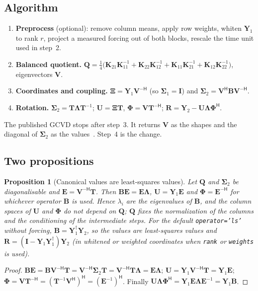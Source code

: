 \documentclass[report]{nld}
\newtheorem{proposition}{Proposition}
\theoremstyle{remark}\newtheorem*{remark}{Remark}
\newcommand{\B}{\mathbf{B}}
\newcommand{\V}{\mathbf{V}}
\newcommand{\T}{\mathbf{T}}
\newcommand{\Y}{\mathbf{Y}}
\newcommand{\K}{\mathbf{K}}
\newcommand{\Q}{\mathbf{Q}}
\newcommand{\U}{\mathbf{U}}
\newcommand{\E}{\mathbf{E}}
\newcommand{\R}{\mathbf{R}}
\newcommand{\Sg}{\symbf{\Sigma}}
\newcommand{\Lam}{\symbf{\Lambda}}
\newcommand{\Ph}{\symbf{\Phi}}
\newcommand{\Xib}{\symbf{\Xi}}
\renewcommand{\H}{\mathsf{H}}
\newcommand{\code}[1]{\texttt{#1}}
\begin{document}
\subsection{Algorithm}\label{sec:algorithm}

\begin{enumerate}
  \item \textbf{Preprocess} (optional): remove column means, apply row weights,
    whiten $\Y_1$ to rank $r$, project a measured forcing out of both blocks,
    rescale the time unit used in step~2.
  \item \textbf{Balanced quotient.}
    $\Q=\tfrac14\big(\K_{21}\K_{11}^{-1}+\K_{22}\K_{12}^{-1}+\K_{11}\K_{21}^{-1}+\K_{12}\K_{22}^{-1}\big)$,
    eigenvectors $\V$.
  \item \textbf{Coordinates and coupling.} $\Xib=\Y_1\V^{-\H}$ (so $\Sg_1=\mathbf{I}$)
    and $\Sg_2=\V^{\H}\B\V^{-\H}$.
  \item \textbf{Rotation.} $\Sg_2=\T\Lam\T^{-1}$; $\U=\Xib\T$, $\Ph=\V\T^{-\H}$;
    $\R=\Y_2-\U\Lam\Ph^\H$.
\end{enumerate}
The published GCVD stops after step~3. It returns $\V$ as the shapes and the
diagonal of $\Sg_2$ as the values~\cite[Algorithm~1, Eqs.~(13)--(14)]{li2025}.
Step~4 is the change.

\subsection{Two propositions}\label{sec:props}

\begin{proposition}[Canonical values are least-squares values]\label{prop:ls}
Let $\Q$ and $\Sg_2$ be diagonalisable and $\E=\V^{-\H}\T$. Then $\B\E=\E\Lam$,
$\U=\Y_1\E$ and $\Ph=\E^{-\H}$ for whichever operator $\B$ is used. Hence
$\lambda_i$ are the eigenvalues of $\B$, and the column spaces of $\U$ and
$\Ph$ do not depend on $\Q$; $\Q$ fixes the normalization of the columns and
the conditioning of the intermediate steps. For the default
\code{operator='ls'} without forcing, $\B=\Y_1^\dagger\Y_2$, so the values are
least-squares values and $\R=(\mathbf{I}-\Y_1\Y_1^\dagger)\Y_2$ (in whitened or
weighted coordinates when \code{rank} or \code{weights} is used).
\end{proposition}
\begin{proof}
$\B\E=\B\V^{-\H}\T=\V^{-\H}\Sg_2\T=\V^{-\H}\T\Lam=\E\Lam$;
$\U=\Y_1\V^{-\H}\T=\Y_1\E$; $\Ph=\V\T^{-\H}=(\T^{-1}\V^\H)^\H=(\E^{-1})^\H$.
Finally $\U\Lam\Ph^\H=\Y_1\E\Lam\E^{-1}=\Y_1\B$.
\end{proof}
\end{document}
